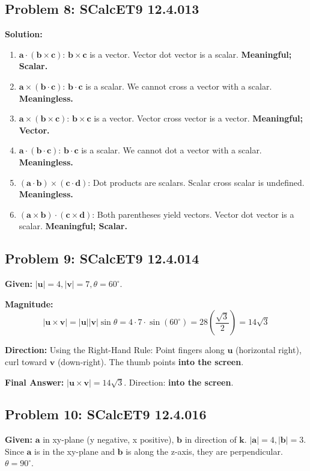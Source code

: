 \documentclass[11pt]{article}
\renewcommand{\vec}[1]{\mathbf{#1}}
\newcommand{\khat}{\mathbf{k}}
\begin{document}
\subsection*{Problem 8: SCalcET9 12.4.013}
\textbf{Solution:}
\begin{enumerate}[label=(\alph*)]
    \item $\vec{a} \cdot (\vec{b} \times \vec{c})$: $\vec{b} \times \vec{c}$ is a vector. Vector dot vector is a scalar. \textbf{Meaningful; Scalar.}
    \item $\vec{a} \times (\vec{b} \cdot \vec{c})$: $\vec{b} \cdot \vec{c}$ is a scalar. We cannot cross a vector with a scalar. \textbf{Meaningless.}
    \item $\vec{a} \times (\vec{b} \times \vec{c})$: $\vec{b} \times \vec{c}$ is a vector. Vector cross vector is a vector. \textbf{Meaningful; Vector.}
    \item $\vec{a} \cdot (\vec{b} \cdot \vec{c})$: $\vec{b} \cdot \vec{c}$ is a scalar. We cannot dot a vector with a scalar. \textbf{Meaningless.}
    \item $(\vec{a} \cdot \vec{b}) \times (\vec{c} \cdot \vec{d})$: Dot products are scalars. Scalar cross scalar is undefined. \textbf{Meaningless.}
    \item $(\vec{a} \times \vec{b}) \cdot (\vec{c} \times \vec{d})$: Both parentheses yield vectors. Vector dot vector is a scalar. \textbf{Meaningful; Scalar.}
\end{enumerate}

\hrulefill

\subsection*{Problem 9: SCalcET9 12.4.014}
\textbf{Given:} $|\vec{u}| = 4, |\vec{v}| = 7, \theta = 60^\circ$.

\textbf{Magnitude:}
\[
|\vec{u} \times \vec{v}| = |\vec{u}| |\vec{v}| \sin \theta = 4 \cdot 7 \cdot \sin(60^\circ) = 28 \left( \frac{\sqrt{3}}{2} \right) = 14\sqrt{3}
\]

\textbf{Direction:}
Using the Right-Hand Rule: Point fingers along $\vec{u}$ (horizontal right), curl toward $\vec{v}$ (down-right). The thumb points \textbf{into the screen}.

\textbf{Final Answer:}
$|\vec{u} \times \vec{v}| = 14\sqrt{3}$. Direction: \textbf{into the screen}.

\hrulefill

\subsection*{Problem 10: SCalcET9 12.4.016}
\textbf{Given:} $\vec{a}$ in xy-plane (y negative, x positive), $\vec{b}$ in direction of $\khat$. $|\vec{a}|=4, |\vec{b}|=3$.
Since $\vec{a}$ is in the xy-plane and $\vec{b}$ is along the z-axis, they are perpendicular. $\theta = 90^\circ$.
\end{document}
